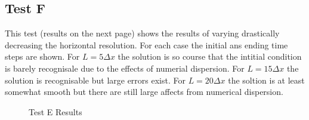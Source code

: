 \documentclass[11pt,twoside]{article}
\begin{document}
\subsection{Test F}

This test (results on the next page) shows the results of varying drastically decreasing the horizontal resolution.  For each case the initial ans ending time steps are shown. For $L=5\Delta x$  the solution is so course that the intitial condition is barely recognisale due to the effects of numerial dispersion. For $L=15\Delta x$ the solution is recognisable but large errors exist. For $L=20\Delta x$ the soltion is at least somewhat smooth but there are still large affects from numerical dispersion. 


\begin{figure}[!h]
\centering
{}
\caption{Test E Results}
\end{figure}
\end{document}
